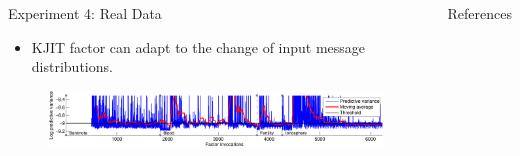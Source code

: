 \documentclass[english]{beamer}
\begin{document}
\begin{frame}
\begin{columns}[t]
\begin{block}{ Experiment 4: Real Data}
\begin{figure}[ht]
  \label{fig:uci_performance}
\end{figure}

\begin{itemize}
    \item KJIT factor can adapt to the change of input message distributions.
\end{itemize}

\begin{figure}
\centering
\includegraphics[width=0.99\textwidth]{online/uci_temporal_uncertainty-crop}
\end{figure}

\end{block}



\begin{block}{References}


\end{block}
\end{columns}
\end{frame}
\end{document}
